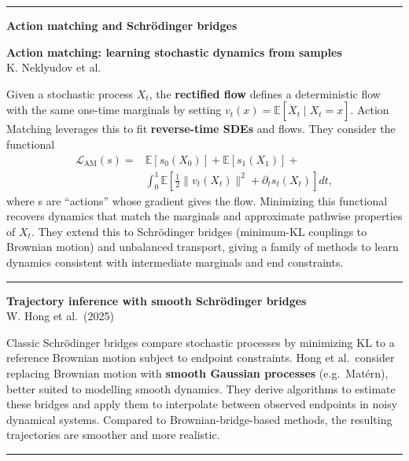 \documentclass[a5paper]{article}
\def\subsection#1{{\par\bigskip\goodbreak\large\bfseries #1\par}}
\begin{document}
\begin{center}\rule{0.5\linewidth}{0.5pt}\end{center}

\subsection{Action matching and Schrödinger
bridges}\label{action-matching-and-schruxf6dinger-bridges}

\textbf{Action matching: learning stochastic dynamics from samples}\\
K. Neklyudov et al.

Given a stochastic process $X_t$, the \textbf{rectified flow} defines a
deterministic flow with the same one-time marginals by setting
$v_t(x)=\mathbb{E}[\dot X_t \mid X_t=x]$. Action Matching leverages this to
fit \textbf{reverse-time SDEs} and flows. They consider the functional
\begin{align*}
  \mathcal{L}_\mathrm{AM}(s) = {}& \mathbb{E}[s_0(X_0)] +
\mathbb{E}[s_1(X_1)] + \\
& \int_0^1
\mathbb{E}\left[\tfrac12\|v_t(X_t)\|^2 + \partial_t s_t(X_t)\right] dt,
\end{align*}
where s are ``actions'' whose gradient gives the flow. Minimizing this
functional recovers dynamics that match the marginals and approximate
pathwise properties of $X_t$. They extend this to Schrödinger bridges
(minimum-KL couplings to Brownian motion) and unbalanced transport,
giving a family of methods to learn dynamics consistent with
intermediate marginals and end constraints.

\begin{center}\rule{0.5\linewidth}{0.5pt}\end{center}

\textbf{Trajectory inference with smooth Schrödinger bridges}\\
W. Hong et al.~(2025)

Classic Schrödinger bridges compare stochastic processes by minimizing
KL to a reference Brownian motion subject to endpoint constraints. Hong
et al.~consider replacing Brownian motion with \textbf{smooth Gaussian
processes} (e.g.~Matérn), better suited to modelling smooth dynamics.
They derive algorithms to estimate these bridges and apply them to
interpolate between observed endpoints in noisy dynamical systems.
Compared to Brownian-bridge-based methods, the resulting trajectories
are smoother and more realistic.

\begin{center}\rule{0.5\linewidth}{0.5pt}\end{center}
\end{document}
